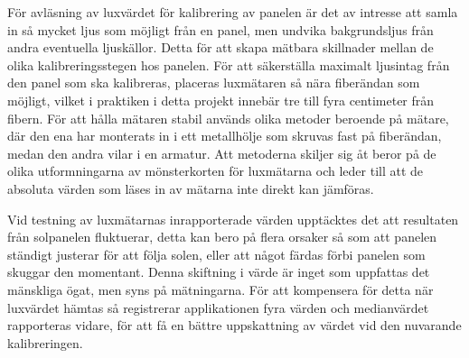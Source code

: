             För avläsning av luxvärdet för kalibrering av panelen är det av intresse att samla in så mycket ljus som möjligt från en panel, men undvika bakgrundsljus från andra eventuella ljuskällor. Detta för att skapa mätbara skillnader mellan de olika kalibreringsstegen hos panelen. För att säkerställa maximalt ljusintag från den panel som ska kalibreras, placeras luxmätaren så nära fiberändan som möjligt, vilket i praktiken i detta projekt innebär tre till fyra centimeter från fibern. För att hålla mätaren stabil används olika metoder beroende på mätare, där den ena har monterats in i ett metallhölje som skruvas fast på fiberändan, medan den andra vilar i en armatur. Att metoderna skiljer sig åt beror på de olika utformningarna av mönsterkorten för luxmätarna och leder till att de absoluta värden som läses in av mätarna inte direkt kan jämföras.\bigskip 

            Vid testning av luxmätarnas inrapporterade värden upptäcktes det att resultaten från solpanelen fluktuerar, detta kan bero på flera orsaker så som att panelen ständigt justerar för att följa solen, eller att något färdas förbi panelen som skuggar den momentant. Denna skiftning i värde är inget som uppfattas det mänskliga ögat, men syns på mätningarna. För att kompensera för detta när luxvärdet hämtas så registrerar applikationen fyra värden och medianvärdet rapporteras vidare, för att få en bättre uppskattning av värdet vid den nuvarande kalibreringen.

